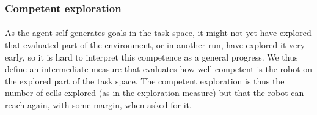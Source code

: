 \documentclass[12pt]{article}
\begin{document}
		
		\subsubsection{Competent exploration}
		
			\paragraph{}
			As the agent self-generates goals in the task space, it might not yet have explored that evaluated part of the environment, 
			or in another run, have explored
			it very early, so it is hard to interpret this competence as a general progress.
			We thus define an intermediate measure that evaluates how well competent is the robot on the explored part of the task space.
			The competent exploration is thus the number of cells explored (as in the exploration measure) but that the robot can reach again,
			with some margin, when asked for it.
		
	 
\end{document}
